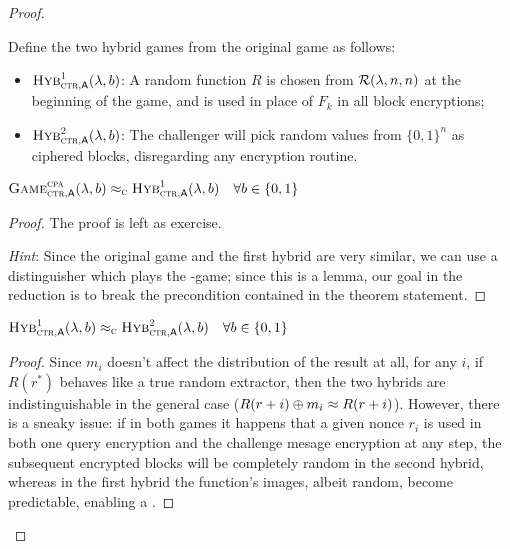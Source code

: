 \begin{proof}
\begin{cryptogame}
        \cseqendloop

        \cseqdelay
        

    \end{cryptogame}

    Define the two hybrid games from the original \cpa{} game as follows:

    \begin{itemize}
        \item $\hybridg{1}[\textsc{ctr}](\lambda, b)$: A random function $R$ is chosen \uar{} from $\mathcal{R}(\lambda, n, n)$ at the beginning of the game, and is used in place of $F_k$ in all block encryptions;
        \item $\hybridg{2}[\textsc{ctr}](\lambda, b)$: The challenger will pick random values from $\{0, 1\}^n$ as ciphered blocks, disregarding any encryption routine.
    \end{itemize}

    \begin{lemma}
        $\cryptog{cpa}[\textsc{ctr}](\lambda, b) \compindist \hybridg{1}[\textsc{ctr}](\lambda, b) \quad \forall b \in \{0, 1\}$
    \end{lemma}

    \begin{proof} The proof is left as exercise.
        
        \emph{Hint}: Since the original game and the first hybrid are very similar, we can use a distinguisher which plays the \cpa-game; since this is a lemma, our goal in the reduction is to break the precondition contained in the theorem statement.
    \end{proof}

    \begin{lemma}
        $\hybridg{1}[\textsc{ctr}](\lambda, b) \compindist \hybridg{2}[\textsc{ctr}](\lambda, b) \quad \forall b \in \{0, 1\}$
    \end{lemma}

    \begin{proof}
    
        Since $m_i$ doesn't affect the distribution of the result at all, for any $i$, if $R(r^{*})$ behaves like a true random extractor, then the two hybrids are indistinguishable in the general case ($R(r + i) \oplus m_i \approx R(r + i)$). However, there is a sneaky issue: if in both games it happens that a given nonce $r_i$ is used in both one query encryption and the challenge mesage encryption at any step, the subsequent encrypted blocks will be completely random in the second hybrid, whereas in the first hybrid the function's images, albeit random, become predictable, enabling a \cpa.


\end{proof}
\end{proof}
